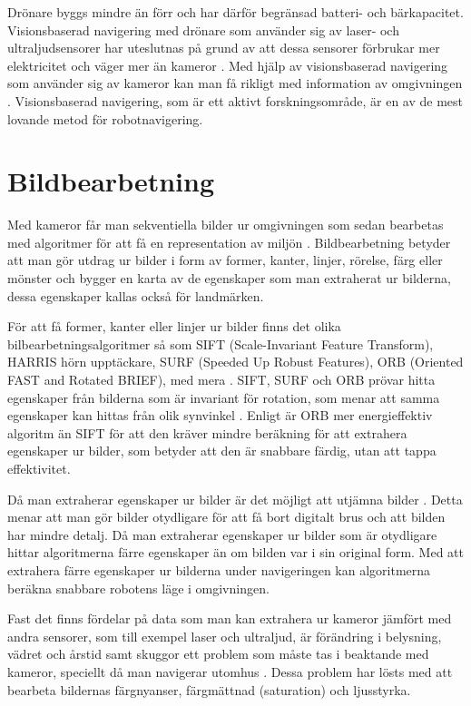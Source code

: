Drönare byggs mindre än förr och har därför begränsad batteri- och bärkapacitet. Visionsbaserad navigering med drönare som använder sig av laser- och ultraljudsensorer har uteslutnas på grund av att dessa sensorer förbrukar mer elektricitet och väger mer än kameror \citep{6385934}. Med hjälp av visionsbaserad navigering som använder sig av kameror kan man få rikligt med information av omgivningen \citep{geospatial}. Visionsbaserad navigering, som är ett aktivt forskningsområde, är en av de mest lovande metod för robotnavigering.

\section{Bildbearbetning}

Med kameror får man sekventiella bilder ur omgivningen som sedan bearbetas med algoritmer för att få en representation av miljön \citep{982903}. Bildbearbetning betyder att man gör utdrag ur bilder i form av former, kanter, linjer, rörelse, färg eller mönster och bygger en karta av de egenskaper som man extraherat ur bilderna, dessa egenskaper kallas också för landmärken. 

För att få former, kanter eller linjer ur bilder finns det olika bilbearbetningsalgoritmer så som SIFT (Scale-Invariant Feature Transform), HARRIS hörn upptäckare, SURF (Speeded Up Robust Features), ORB (Oriented FAST and Rotated BRIEF), med mera \citep{orb, slamproblem, mapbuildingsift}. SIFT, SURF och ORB prövar hitta egenskaper från bilderna som är invariant för rotation, som menar att samma egenskaper kan hittas från olik synvinkel \citep{orb}. Enligt \cite{orb} är ORB mer energieffektiv algoritm än SIFT för att den kräver mindre beräkning för att extrahera egenskaper ur bilder, som betyder att den är snabbare färdig, utan att tappa effektivitet.

Då man extraherar egenskaper ur bilder är det möjligt att utjämna bilder \citep{mapbuildingsift}. Detta menar att man gör bilder otydligare för att få bort digitalt brus och att bilden har mindre detalj. Då man extraherar egenskaper ur bilder som är otydligare hittar algoritmerna färre egenskaper än om bilden var i sin original form. Med att extrahera färre egenskaper ur bilderna under navigeringen kan algoritmerna beräkna snabbare robotens läge i omgivningen. 

Fast det finns fördelar på data som man kan extrahera ur kameror jämfört med andra sensorer, som till exempel laser och ultraljud, är förändring i belysning, vädret och årstid samt skuggor ett problem som måste tas i beaktande med kameror, speciellt då man navigerar utomhus \citep{982903}. Dessa problem har lösts med att bearbeta bildernas färgnyanser, färgmättnad (saturation) och ljusstyrka.

